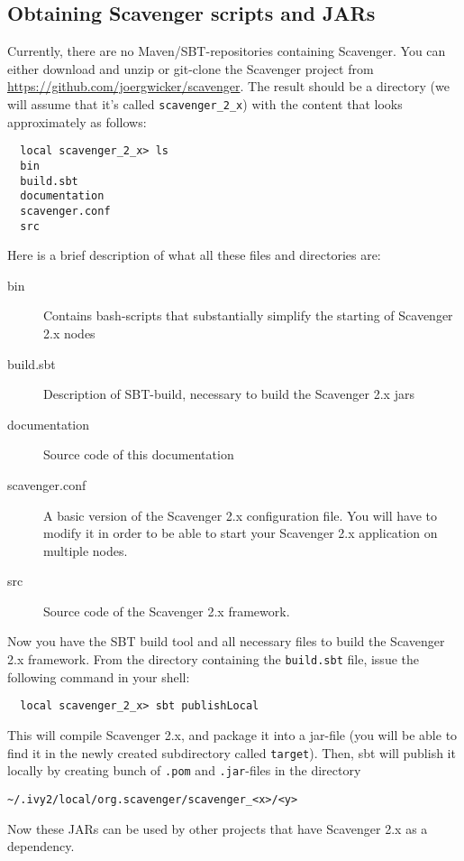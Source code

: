 \documentclass{scrbook}
\begin{document}
\subsection{Obtaining Scavenger scripts and JARs}
Currently, there are no Maven/SBT-repositories containing Scavenger.
You can either download and unzip or git-clone the Scavenger project from 
\url{https://github.com/joergwicker/scavenger}.
The result should be a directory (we will assume that it's called \lstinline{scavenger_2_x}) with the content that 
looks approximately as follows:
\begin{lstlisting}
  local scavenger_2_x> ls
  bin
  build.sbt
  documentation
  scavenger.conf
  src
\end{lstlisting}
Here is a brief description of what all these files and directories are:
\begin{description}
  \item[bin] Contains bash-scripts that substantially simplify the
    starting of Scavenger 2.x nodes
  \item[build.sbt] Description of SBT-build, necessary to build the 
    Scavenger 2.x jars
  \item[documentation] Source code of this documentation
  \item[scavenger.conf] A basic version of the Scavenger 2.x configuration
    file. You will have to modify it in order to be able to start your
    Scavenger 2.x application on multiple nodes.
  \item[src] Source code of the Scavenger 2.x framework.
\end{description}

Now you have the SBT build tool and all necessary files to build 
the Scavenger 2.x framework. From the directory containing the
\lstinline{build.sbt} file, issue the following command in your shell:
\begin{lstlisting}
  local scavenger_2_x> sbt publishLocal
\end{lstlisting}
This will compile Scavenger 2.x, and package it into a jar-file 
(you will be able to find it in the newly created subdirectory
called \lstinline{target}). 
Then, sbt will publish it locally by creating bunch of \lstinline{.pom} and \lstinline{.jar}-files in the directory 
\begin{lstlisting}
~/.ivy2/local/org.scavenger/scavenger_<x>/<y>
\end{lstlisting} 
Now these JARs can be 
used by other projects that have Scavenger 2.x as a dependency.
\end{document}
